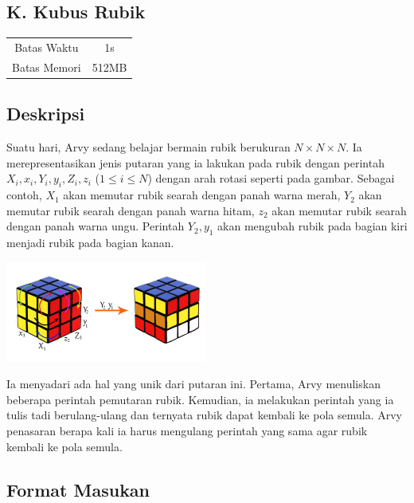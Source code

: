 \documentclass{article}
\begin{document}
\begin{center}
    \section*{K. Kubus Rubik}

    \begin{tabular}{ | c c | }
        \hline
        Batas Waktu  & 1s \\
        Batas Memori & 512MB \\
        \hline
    \end{tabular}
\end{center}

\subsection*{Deskripsi}

Suatu hari, Arvy sedang belajar bermain rubik berukuran $N \times N \times N$.
Ia merepresentasikan jenis putaran yang ia lakukan pada rubik dengan perintah $X_i, x_i, Y_i, y_i, Z_i, z_i$ ($1 \leq i \leq N$) dengan arah rotasi seperti pada gambar.
Sebagai contoh, $X_1$ akan memutar rubik searah dengan panah warna merah, $Y_2$ akan memutar rubik searah dengan panah warna hitam, $z_2$ akan memutar rubik searah dengan panah warna ungu.
Perintah $Y_2, y_1$ akan mengubah rubik pada bagian kiri menjadi rubik pada bagian kanan.

\begin{center}
    \includegraphics[width=250px]{rubic}
\end{center}

Ia menyadari ada hal yang unik dari putaran ini.
Pertama, Arvy menuliskan beberapa perintah pemutaran rubik.
Kemudian, ia melakukan perintah yang ia tulis tadi berulang-ulang dan ternyata rubik dapat kembali ke pola semula.
Arvy penasaran berapa kali ia harus mengulang perintah yang sama agar rubik kembali ke pola semula.

\subsection*{Format Masukan}
\end{document}
